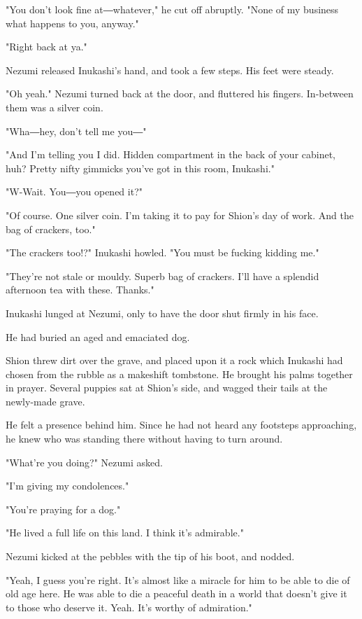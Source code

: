 "You don't look fine at―whatever," he cut off abruptly. "None of my
business what happens to you, anyway."

"Right back at ya."

Nezumi released Inukashi's hand, and took a few steps. His feet were
steady.

"Oh yeah." Nezumi turned back at the door, and fluttered his fingers.
In-between them was a silver coin.

"Wha―hey, don't tell me you―"

"And I'm telling you I did. Hidden compartment in the back of your
cabinet, huh? Pretty nifty gimmicks you've got in this room, Inukashi."

"W-Wait. You―you opened it?"

"Of course. One silver coin. I'm taking it to pay for Shion's day of
work. And the bag of crackers, too."

"The crackers too!?" Inukashi howled. "You must be fucking kidding me."

"They're not stale or mouldy. Superb bag of crackers. I'll have a
splendid afternoon tea with these. Thanks."

Inukashi lunged at Nezumi, only to have the door shut firmly in his
face.

\myspace

He had buried an aged and emaciated dog.

Shion threw dirt over the grave, and placed upon it a rock which
Inukashi had chosen from the rubble as a makeshift tombstone. He brought
his palms together in prayer. Several puppies sat at Shion's side, and
wagged their tails at the newly-made grave.

He felt a presence behind him. Since he had not heard any footsteps
approaching, he knew who was standing there without having to turn
around.

"What're you doing?" Nezumi asked.

"I'm giving my condolences."

"You're praying for a dog."

"He lived a full life on this land. I think it's admirable."

Nezumi kicked at the pebbles with the tip of his boot, and nodded.

"Yeah, I guess you're right. It's almost like a miracle for him to be
able to die of old age here. He was able to die a peaceful death in a
world that doesn't give it to those who deserve it. Yeah. It's worthy of
admiration."

